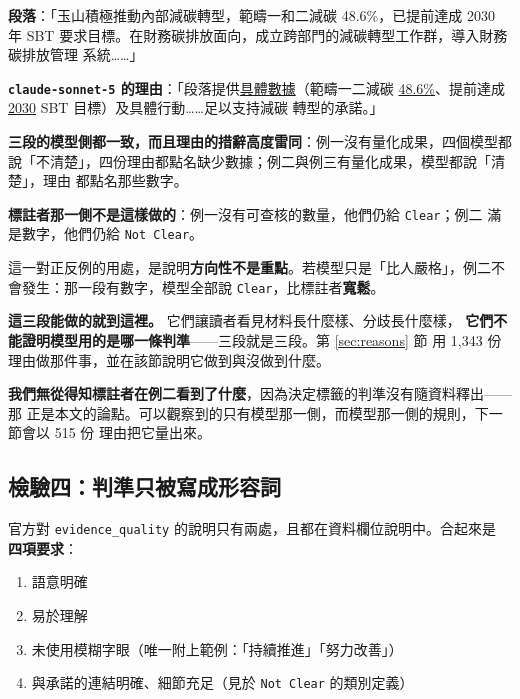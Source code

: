 \documentclass[11pt,a4paper]{ctexart}
\newcommand{\fn}[1]{\texttt{#1}}
\begin{document}
\begin{tcolorbox}[colback=green!5, colframe=green!45, breakable,
  title=例三（\fn{id 13295}）　對照組：人類標註與四個模型都是 \fn{Clear}]
\small
\textbf{段落}：「玉山積極推動內部減碳轉型，範疇一和二減碳 48.6\%，已提前達成 2030 年
SBT 要求目標。在財務碳排放面向，成立跨部門的減碳轉型工作群，導入財務碳排放管理
系統……」

\smallskip
\textbf{\fn{claude-sonnet-5} 的理由}：「段落提供\underline{具體數據}（範疇一二減碳
\underline{48.6\%}、提前達成 \underline{2030} SBT 目標）及具體行動……足以支持減碳
轉型的承諾。」
\end{tcolorbox}

\begin{tcolorbox}[colback=blue!5, colframe=blue!55, title=三段擺在一起說明了什麼]
\textbf{三段的模型側都一致，而且理由的措辭高度雷同}：例一沒有量化成果，四個模型都
說「不清楚」，四份理由都點名缺少數據；例二與例三有量化成果，模型都說「清楚」，理由
都點名那些數字。

\medskip
\textbf{標註者那一側不是這樣做的}：例一沒有可查核的數量，他們仍給 \fn{Clear}；例二
滿是數字，他們仍給 \fn{Not Clear}。

\medskip
這一對正反例的用處，是說明\textbf{方向性不是重點}。若模型只是「比人嚴格」，例二不
會發生：那一段有數字，模型全部說 \fn{Clear}，比標註者\textbf{寬鬆}。

\medskip
\textbf{這三段能做的就到這裡。} 它們讓讀者看見材料長什麼樣、分歧長什麼樣，
\textbf{它們不能證明模型用的是哪一條判準}——三段就是三段。第 \ref{sec:reasons} 節
用 1{,}343 份理由做那件事，並在該節說明它做到與沒做到什麼。

\medskip
\textbf{我們無從得知標註者在例二看到了什麼}，因為決定標籤的判準沒有隨資料釋出——那
正是本文的論點。可以觀察到的只有模型那一側，而模型那一側的規則，下一節會以 515 份
理由把它量出來。
\end{tcolorbox}

\subsection{檢驗四：判準只被寫成形容詞}

官方對 \fn{evidence\_quality} 的說明只有兩處，且都在資料欄位說明中。合起來是
\textbf{四項要求}：

\begin{enumerate}[leftmargin=2.2em, itemsep=1pt]
  \item 語意明確
  \item 易於理解
  \item 未使用模糊字眼（唯一附上範例：「持續推進」「努力改善」）
  \item 與承諾的連結明確、細節充足（見於 \fn{Not Clear} 的類別定義）
\end{enumerate}
\end{document}

